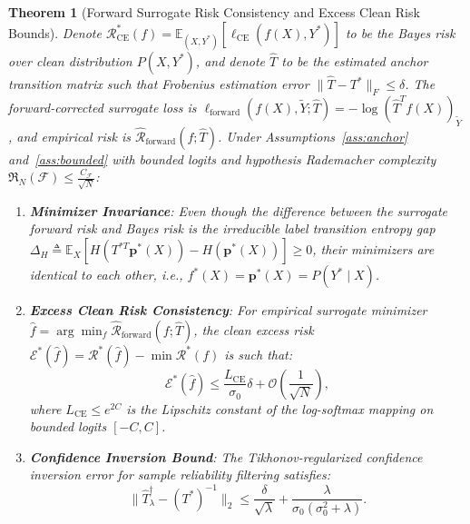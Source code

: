 \documentclass[10pt,journal]{IEEEtran}
\newtheorem{theorem}{Theorem}
\begin{document}
\begin{theorem}[Forward Surrogate Risk Consistency and Excess Clean Risk Bounds]
\label{thm:consistency}
Denote $\mathcal{R}^*_{\mathrm{CE}}(f) = \mathbb{E}_{(X, Y^*)} [\ell_{\mathrm{CE}}(f(X), Y^*)]$ to be the Bayes risk over clean distribution $P(X, Y^*)$, and denote $\hat{T}$ to be the estimated anchor transition matrix such that Frobenius estimation error $\|\hat{T} - T^*\|_F \le \delta$. The forward-corrected surrogate loss is $\ell_{\mathrm{forward}}(f(X), \tilde{Y}; \hat{T}) = -\log (\hat{T}^T f(X))_{\tilde{Y}}$, and empirical risk is $\hat{\mathcal{R}}_{\mathrm{forward}}(f; \hat{T})$. Under Assumptions~\ref{ass:anchor} and~\ref{ass:bounded} with bounded logits and hypothesis Rademacher complexity $\mathfrak{R}_N(\mathcal{F}) \le \frac{C_{\mathcal{F}}}{\sqrt{N}}$:
\begin{enumerate}
    \item \textbf{Minimizer Invariance}: Even though the difference between the surrogate forward risk and Bayes risk is the irreducible label transition entropy gap $\Delta_H \triangleq \mathbb{E}_X [H(T^{*T}\mathbf{p}^*(X)) - H(\mathbf{p}^*(X))] \ge 0$, their minimizers are identical to each other, i.e., $f^*(X) = \mathbf{p}^*(X) = P(Y^* \mid X)$.
    \item \textbf{Excess Clean Risk Consistency}: For empirical surrogate minimizer $\hat{f} = \arg\min_f \hat{\mathcal{R}}_{\mathrm{forward}}(f; \hat{T})$, the clean excess risk $\mathcal{E}^*(\hat{f}) = \mathcal{R}^*(\hat{f}) - \min \mathcal{R}^*(f)$ is such that:
    \begin{equation}
        \mathcal{E}^*(\hat{f}) \le \frac{L_{\mathrm{CE}}}{\sigma_0} \delta + \mathcal{O}\left(\frac{1}{\sqrt{N}}\right),
    \end{equation}
    where $L_{\mathrm{CE}} \le e^{2C}$ is the Lipschitz constant of the log-softmax mapping on bounded logits $[-C, C]$.
    \item \textbf{Confidence Inversion Bound}: The Tikhonov-regularized confidence inversion error for sample reliability filtering satisfies:
    \begin{equation}
        \|\hat{T}^{\dagger}_\lambda - (T^*)^{-1}\|_2 \le \frac{\delta}{\sqrt{\lambda}} + \frac{\lambda}{\sigma_0(\sigma_0^2 + \lambda)}.
    \end{equation}
\end{enumerate}
\end{theorem}
\end{document}

